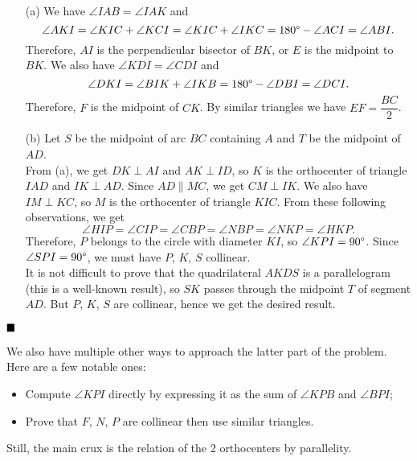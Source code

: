 \documentclass[11pt]{article}
\newenvironment{solution}[1][Solution]{%
  \proof[\normalfont \faPenNib \hspace{0.2cm} \ttfamily \scshape \large #1]%
}{\(\hfill \blacksquare\){\parfillskip0pt\par}}
\theoremstyle{definition}
\begin{document}
        \begin{solution}
            \hfill
            \begin{enumerate}
                \item[(a)] We have \(\angle IAB = \angle IAK\) and
                \[\angle AKI = \angle KIC + \angle KCI = \angle KIC + \angle IKC = 180 \degree - \angle ACI = \angle ABI.\]
                Therefore, \(AI\) is the perpendicular bisector of \(BK\), or \(E\) is the midpoint to \(BK\). We also have \(\angle KDI = \angle CDI\) and
                \[\angle DKI = \angle BIK + \angle IKB = 180 \degree - \angle DBI = \angle DCI.\]
                Therefore, \(F\) is the midpoint of \(CK\). By similar triangles we have \(EF = \dfrac{BC}{2}\).
                
                \item[(b)] Let \(S\) be the midpoint of arc \(BC\) containing \(A\) and \(T\) be the midpoint of \(AD\).\\
                From (a), we get \(DK \perp AI\) and \(AK \perp ID\), so \(K\) is the orthocenter of triangle \(IAD\) and \(IK \perp AD\). Since \(AD \parallel MC\), we get \(CM \perp IK\). We also have \(IM \perp KC\), so \(M\) is the orthocenter of triangle \(KIC\). From these following observations, we get
                \[\angle HIP = \angle CIP = \angle CBP = \angle NBP = \angle NKP = \angle HKP.\]
                Therefore, \(P\) belongs to the circle with diameter \(KI\), so \(\angle KPI = 90 \degree\). Since \(\angle SPI = 90 \degree\), we must have \(P\), \(K\), \(S\) collinear.\\
                It is not difficult to prove that the quadrilateral \(AKDS\) is a parallelogram (this is a well-known result), so \(SK\) passes through the midpoint \(T\) of segment \(AD\). But \(P\), \(K\), \(S\) are collinear, hence we get the desired result.
            \end{enumerate}
        \end{solution}

        \begin{remark}
            We also have multiple other ways to approach the latter part of the problem. Here are a few notable ones:
            
            \begin{itemize}
                \item Compute \(\angle KPI\) directly by expressing it as the sum of \(\angle KPB\) and \(\angle BPI\);
                \item Prove that \(F\), \(N\), \(P\) are collinear then use similar triangles.
            \end{itemize}

            Still, the main crux is the relation of the 2 orthocenters by parallelity.
        \end{remark}
\end{document}

